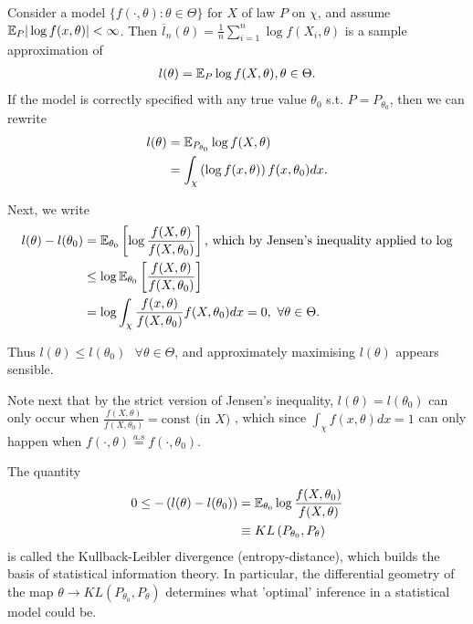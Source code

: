 \documentclass[a4paper]{article}
\begin{document}
\begin{observation}[1]
	Consider a model $\{f(\cdot , \theta) : \theta \in \Theta\}$ for $X$ of law $P$ on $\chi$, and assume $\mathbb{E}_{P} |\log f(x, \theta)| < \infty$. Then $\overline{l}_{n}(\theta) = \frac{1}{n}\sum_{i=1}^{n}\log f(X_{i}, \theta)$ is a sample approximation of
	\begin{align*}
		l(\theta) = \mathbb{E}_{P} \log f(X, \theta), \theta \in \Theta
	.\end{align*}
	If the model is correctly specified with any true value $\theta_{0}$ s.t. $P=P_{\theta_{0}}$, then we can rewrite
	\begin{align*}
		l(\theta) &= \mathbb{E}_{P_{\theta_{0}}} \log f(X, \theta) \\
		&= \int_{\chi} \left(\log f(x, \theta) \right) f(x, \theta_{0}) dx
	.\end{align*}

	Next, we write 
	\begin{align*}
		l(\theta) - l(\theta_{0}) &= \mathbb{E}_{\theta_{0}}\left[ \log \frac{f(X, \theta)}{f(X, \theta_{0})} \right] \text{, which by Jensen's inequality applied to log} \\
		&\le \log \mathbb{E}_{\theta_{0}}\left[ \frac{f(X, \theta)}{f(X, \theta_{0})} \right] \\
		&= \log \int_{\chi} \frac{f(x, \theta)}{f(X, \theta_{0})} f(X, \theta_{0}) dx = 0,\text{ } \forall \theta \in  \Theta
	.\end{align*}

	Thus $l(\theta) \le l(\theta_{0}) \text{ }\forall \theta \in \Theta$, and approximately maximising $l(\theta)$ appears sensible.

	Note next that by the strict version of Jensen's inequality,  $l(\theta) = l(\theta_{0})$ can only occur when $\frac{f(X, \theta)}{f(X, \theta_{0})} = \text{const (in $X$) }$, which since $\int_{\chi} f(x, \theta) dx = 1$ can only happen when $f(\cdot , \theta) \stackrel{a.s}{=} f(\cdot , \theta_{0})$.
\end{observation}

The quantity 
\begin{align*}
	0 \le  -\left( l(\theta) - l(\theta_{0}) \right) &= \mathbb{E}_{\theta_{0}} \log \frac{f(X, \theta_{0})}{f(X, \theta)} \\
	&\equiv KL\left( P_{\theta_{0}}, P_{\theta} \right) 
\end{align*}
is called the Kullback-Leibler divergence (entropy-distance), which builds the basis of statistical information theory. In particular, the differential geometry of the map $\theta \to KL\left( P_{\theta_{0}}, P_{\theta} \right)$ determines what 'optimal' inference in a statistical model could be.
\end{document}
